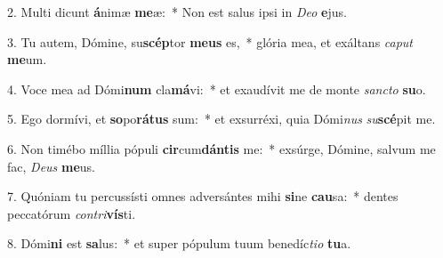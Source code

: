 2. Multi dicunt \textbf{á}nimæ \textbf{me}æ:~*  Non est salus ipsi in \textit{De}\textit{o} \textbf{e}jus.\

3. Tu autem, Dómine, su\textbf{scép}tor \textbf{me}\textbf{us} es,~*  glória mea, et exáltans \textit{ca}\textit{put} \textbf{me}um.\

4. Voce mea ad Dómi\textbf{num} cla\textbf{má}vi:~*  et exaudívit me de monte \textit{sanc}\textit{to} \textbf{su}o.\

5. Ego dormívi, et \textbf{so}po\textbf{rá}\textbf{tus} sum:~*  et exsurréxi, quia Dómi\textit{nus} \textit{su}\textbf{scé}pit me.\

6. Non timébo míllia pópuli \textbf{cir}cum\textbf{dán}\textbf{tis} me:~*  exsúrge, Dómine, salvum me fac, \textit{De}\textit{us} \textbf{me}us.\

7. Quóniam tu percussísti omnes adversántes mihi \textbf{si}ne \textbf{cau}sa:~*  dentes peccatórum \textit{con}\textit{tri}\textbf{vís}ti.\

8. Dómi\textbf{ni} est \textbf{sa}lus:~*  et super pópulum tuum benedíc\textit{ti}\textit{o} \textbf{tu}a.\

